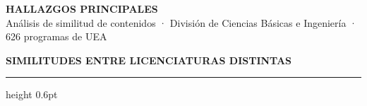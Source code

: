 \documentclass[9pt,a4paper]{article}
\newcommand{\SECHEAD}[1]{%
  {\fontsize{6}{7}\selectfont\bfseries\color{paperbg}\MakeUppercase{#1}}%
  \par\nointerlineskip\vspace{1pt}%
  {\color{uamred}\hrule height 0.6pt}\par\vspace{3pt}}
\begin{document}
\newpage


\begin{tcolorbox}[hdr]
{\fontsize{11.5}{13.5}\selectfont\bfseries\color{white}HALLAZGOS PRINCIPALES}\\[1pt]
{\small\color{white!60!uamred}%
Análisis de similitud de contenidos · División de Ciencias Básicas e Ingeniería · 626 programas de UEA}
\end{tcolorbox}

\vfill

\SECHEAD{similitudes entre licenciaturas distintas}
\end{document}
